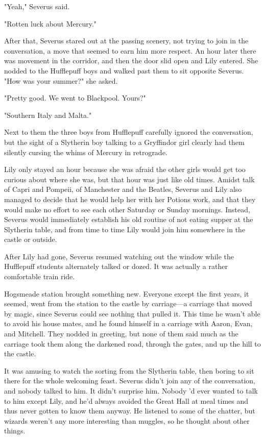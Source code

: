 "Yeah," Severus said.

"Rotten luck about Mercury."

After that, Severus stared out at the passing scenery, not trying to join in the conversation, a move that seemed to earn him more respect. An hour later there was movement in the corridor, and then the door slid open and Lily entered. She nodded to the Hufflepuff boys and walked past them to sit opposite Severus. "How was your summer?" she asked.

"Pretty good. We went to Blackpool. Yours?"

"Southern Italy and Malta."

Next to them the three boys from Hufflepuff carefully ignored the conversation, but the sight of a Slytherin boy talking to a Gryffindor girl clearly had them silently cursing the whims of Mercury in retrograde.

Lily only stayed an hour because she was afraid the other girls would get too curious about where she was, but that hour was just like old times. Amidst talk of Capri and Pompeii, of Manchester and the Beatles, Severus and Lily also managed to decide that he would help her with her Potions work, and that they would make no effort to see each other Saturday or Sunday mornings. Instead, Severus would immediately establish his old routine of not eating supper at the Slytherin table, and from time to time Lily would join him somewhere in the castle or outside.

After Lily had gone, Severus resumed watching out the window while the Hufflepuff students alternately talked or dozed. It was actually a rather comfortable train ride.

Hogsmeade station brought something new. Everyone except the first years, it seemed, went from the station to the castle by carriage—a carriage that moved by magic, since Severus could see nothing that pulled it. This time he wasn't able to avoid his house mates, and he found himself in a carriage with Aaron, Evan, and Mitchell. They nodded in greeting, but none of them said much as the carriage took them along the darkened road, through the gates, and up the hill to the castle.

It was amusing to watch the sorting from the Slytherin table, then boring to sit there for the whole welcoming feast. Severus didn't join any of the conversation, and nobody talked to him. It didn't surprise him. Nobody 'd ever wanted to talk to him except Lily, and he'd always avoided the Great Hall at meal times and thus never gotten to know them anyway. He listened to some of the chatter, but wizards weren't any more interesting than muggles, so he thought about other things.

